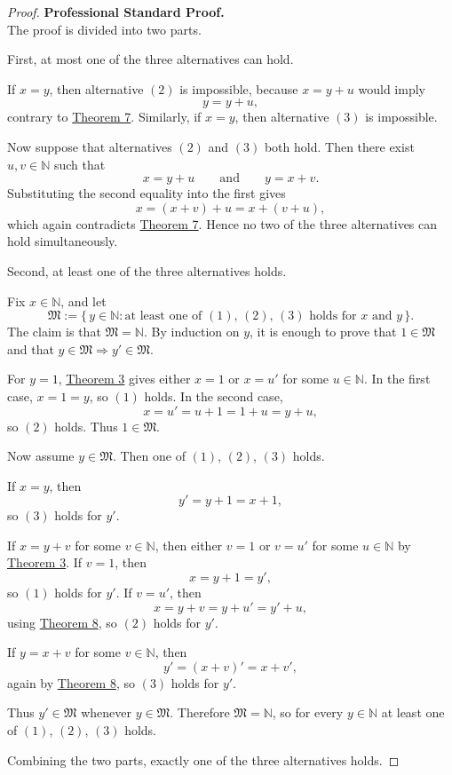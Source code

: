 \begin{proof}
\textbf{Professional Standard Proof.}~\\
The proof is divided into two parts.

First, at most one of the three alternatives can hold.

If \(x=y\), then alternative \((2)\) is impossible, because \(x=y+u\) would imply
\[
y=y+u,
\]
contrary to \hyperref[thm:no-natural-number-equals-itself-plus-a-natural-number]{Theorem 7}. Similarly, if \(x=y\), then alternative \((3)\) is impossible.

Now suppose that alternatives \((2)\) and \((3)\) both hold. Then there exist \(u,v\in\mathbb{N}\) such that
\[
x=y+u
\qquad\text{and}\qquad
y=x+v.
\]
Substituting the second equality into the first gives
\[
x=(x+v)+u=x+(v+u),
\]
which again contradicts \hyperref[thm:no-natural-number-equals-itself-plus-a-natural-number]{Theorem 7}. Hence no two of the three alternatives can hold simultaneously.

Second, at least one of the three alternatives holds.

Fix \(x\in\mathbb{N}\), and let
\[
\mathfrak{M}:=\{\,y\in\mathbb{N} : \text{at least one of \((1)\), \((2)\), \((3)\) holds for }x\text{ and }y\,\}.
\]
The claim is that \(\mathfrak{M}=\mathbb{N}\). By induction on \(y\), it is enough to prove that \(1\in\mathfrak{M}\) and that \(y\in\mathfrak{M}\Rightarrow y'\in\mathfrak{M}\).

For \(y=1\), \hyperref[thm:every-natural-number-is-one-or-a-successor]{Theorem 3} gives either \(x=1\) or \(x=u'\) for some \(u\in\mathbb{N}\). In the first case, \(x=1=y\), so \((1)\) holds. In the second case,
\[
x=u'=u+1=1+u=y+u,
\]
so \((2)\) holds. Thus \(1\in\mathfrak{M}\).

Now assume \(y\in\mathfrak{M}\). Then one of \((1)\), \((2)\), \((3)\) holds.

If \(x=y\), then
\[
y'=y+1=x+1,
\]
so \((3)\) holds for \(y'\).

If \(x=y+v\) for some \(v\in\mathbb{N}\), then either \(v=1\) or \(v=u'\) for some \(u\in\mathbb{N}\) by \hyperref[thm:every-natural-number-is-one-or-a-successor]{Theorem 3}. If \(v=1\), then
\[
x=y+1=y',
\]
so \((1)\) holds for \(y'\). If \(v=u'\), then
\[
x=y+v=y+u'=y'+u,
\]
using \hyperref[thm:successor-addition-rule]{Theorem 8}, so \((2)\) holds for \(y'\).

If \(y=x+v\) for some \(v\in\mathbb{N}\), then
\[
y'=(x+v)'=x+v',
\]
again by \hyperref[thm:successor-addition-rule]{Theorem 8}, so \((3)\) holds for \(y'\).

Thus \(y'\in\mathfrak{M}\) whenever \(y\in\mathfrak{M}\). Therefore \(\mathfrak{M}=\mathbb{N}\), so for every \(y\in\mathbb{N}\) at least one of \((1)\), \((2)\), \((3)\) holds.

Combining the two parts, exactly one of the three alternatives holds.
\end{proof}

